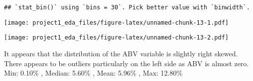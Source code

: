 \documentclass[]{article}
\newenvironment{Shaded}{\begin{snugshade}}{\end{snugshade}}
\newcommand{\CommentTok}[1]{\textcolor[rgb]{0.56,0.35,0.01}{\textit{#1}}}
\newcommand{\DataTypeTok}[1]{\textcolor[rgb]{0.13,0.29,0.53}{#1}}
\newcommand{\KeywordTok}[1]{\textcolor[rgb]{0.13,0.29,0.53}{\textbf{#1}}}
\newcommand{\NormalTok}[1]{#1}
\newcommand{\OperatorTok}[1]{\textcolor[rgb]{0.81,0.36,0.00}{\textbf{#1}}}
\newcommand{\StringTok}[1]{\textcolor[rgb]{0.31,0.60,0.02}{#1}}
\begin{document}
\begin{Shaded}
\end{Shaded}

\begin{verbatim}
## `stat_bin()` using `bins = 30`. Pick better value with `binwidth`.
\end{verbatim}

\texttt{[image: project1\_eda\_files/figure-latex/unnamed-chunk-13-1.pdf]}

\begin{Shaded}
\end{Shaded}

\texttt{[image: project1\_eda\_files/figure-latex/unnamed-chunk-13-2.pdf]}

It appears that the distribution of the ABV variable is slightly right
skewed. There appears to be outliers particularly on the left side as
ABV is almost zero.\\
Min: 0.10\% , Median: 5.60\% , Mean: 5.96\% , Max: 12.80\%
\end{document}
